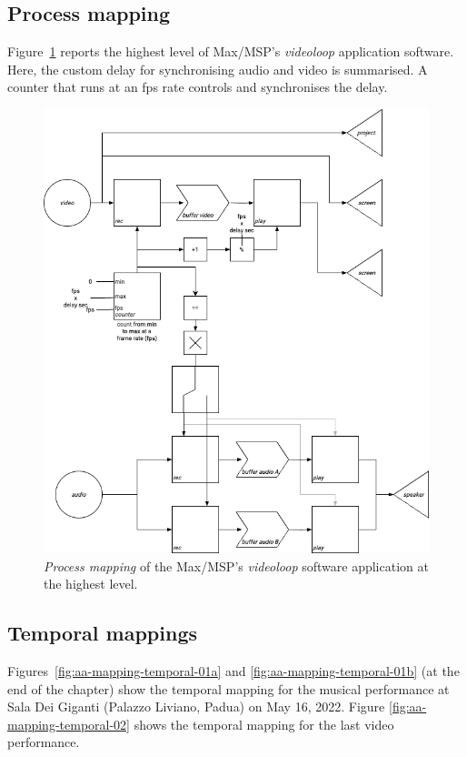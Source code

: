 \subsection*{Process mapping}
Figure~\ref{fig:aa-mapping-process} reports the highest level of Max/MSP’s \textit{videoloop} application software. Here, the custom delay for synchronising audio and video is summarised. A counter that runs at an fps rate controls and synchronises the delay. 

\begin{figure}[!h]
    \centering
    \includegraphics[width=0.85\linewidth]{chapters/appendix/a/image/grapha-data-process.png}
    \caption{\textit{Process mapping} of the Max/MSP’s \textit{videoloop} software application at the highest level.}
    \label{fig:aa-mapping-process}
\end{figure}

\subsection*{Temporal mappings}
Figures~\ref{fig:aa-mapping-temporal-01a} and \ref{fig:aa-mapping-temporal-01b} (at the end of the chapter) show the temporal mapping for the musical performance at Sala Dei Giganti (Palazzo Liviano, Padua) on May 16, 2022. Figure \ref{fig:aa-mapping-temporal-02} shows the temporal mapping for the last video performance.

